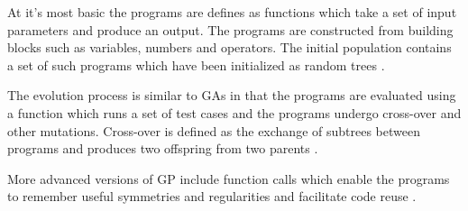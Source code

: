 At it's most basic the programs are defines as functions which take a set of input parameters and produce an output. The programs are constructed from building blocks such as variables, numbers and operators. The initial population contains a set of such programs which have been initialized as random trees \cite{Michalewicz1997}.

The evolution process is similar to GAs in that the programs are evaluated using a function which runs a set of test cases and the programs undergo cross-over and other mutations. Cross-over is defined as the exchange of subtrees between programs and produces two offspring from two parents \cite{Michalewicz1997}.

More advanced versions of GP include function calls which enable the programs to remember useful symmetries and regularities and facilitate code reuse \cite{Michalewicz1997}.

